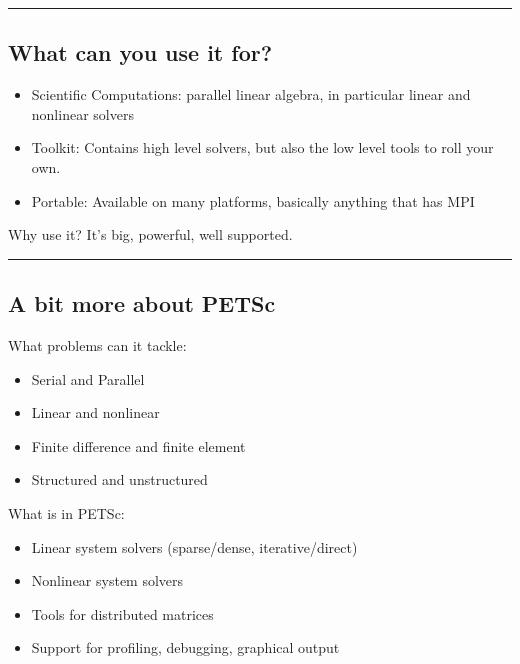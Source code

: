 \documentclass{article}
\begin{document}
    \begin{center}\rule{3in}{0.4pt}\end{center}

\subsection{What can you use it for?}\label{what-can-you-use-it-for}

\begin{itemize}
\itemsep1pt\parskip0pt
\item
  Scientific Computations: parallel linear algebra, in particular linear
  and nonlinear solvers
\item
  Toolkit: Contains high level solvers, but also the low level tools to
  roll your own.
\item
  Portable: Available on many platforms, basically anything that has MPI
\end{itemize}

Why use it? It's big, powerful, well supported.

    \begin{center}\rule{3in}{0.4pt}\end{center}

\subsection{A bit more about PETSc}\label{a-bit-more-about-petsc}

What problems can it tackle:

\begin{itemize}
\itemsep1pt\parskip0pt
\item
  Serial and Parallel
\item
  Linear and nonlinear
\item
  Finite difference and finite element
\item
  Structured and unstructured
\end{itemize}

What is in PETSc:

\begin{itemize}
\itemsep1pt\parskip0pt
\item
  Linear system solvers (sparse/dense, iterative/direct)
\item
  Nonlinear system solvers
\item
  Tools for distributed matrices
\item
  Support for profiling, debugging, graphical output
\end{itemize}
\end{document}

